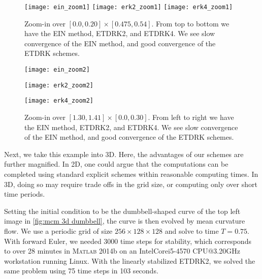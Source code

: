 \begin{figure}[htb!]
        \centering
\texttt{[image: ein\_zoom1]}
\texttt{[image: erk2\_zoom1]}
\texttt{[image: erk4\_zoom1]}
\caption[{Zoom-in over $ [0.0,0.20]\times [0.475,0.54]$ to inspect convergence}]{Zoom-in over $[0.0, 0.20]\times [0.475, 0.54]$. From top to bottom we have the EIN method, ETDRK2, and ETDRK4. We see slow convergence of the EIN method, and good convergence of the ETDRK schemes.}
\label{fig:mcm zoom in 1}
\end{figure}

\begin{figure}[htb!]
        \centering
\begin{minipage}{0.30\textwidth}
        \texttt{[image: ein\_zoom2]}
\end{minipage}
\begin{minipage}{0.30\textwidth}
        \texttt{[image: erk2\_zoom2]}
\end{minipage}
\begin{minipage}{0.30\textwidth}
        \texttt{[image: erk4\_zoom2]}
\end{minipage}
\caption[{A zoom-in over $[1.30,1.41]\times [0.0, 0.30]$ to inspect convergence}]{Zoom-in over $[1.30,1.41]\times [0.0, 0.30]$. From left to right we have the EIN method, ETDRK2, and ETDRK4. We see slow convergence of the EIN method, and good convergence of the ETDRK schemes.}
\label{fig:mcm zoom in 2}
\end{figure}

Next, we take this example into 3D. Here, the advantages of our schemes are further magnified. In 2D, one could argue that the computations can be completed using standard explicit schemes within reasonable computing times. In 3D, doing so may require trade offs in the grid size, or computing only over short time periods. 

Setting the initial condition to be the dumbbell-shaped curve of the top left image in \cref{fig:mcm 3d dumbbell}, the curve is then evolved by mean curvature flow. We use a periodic grid of size $256\times 128\times 128$ and solve to time $T=0.75$. With forward Euler, we needed $3000$ time steps for stability, which corresponds to over 28 minutes in \textsc{Matlab} 2014b on an Intel\textsuperscript{\textregistered}Core\textsuperscript{\texttrademark}i5-4570 CPU@3.20GHz workstation running Linux. With the linearly stabilized ETDRK2, we solved the same problem using 75 time steps in 103 seconds.

